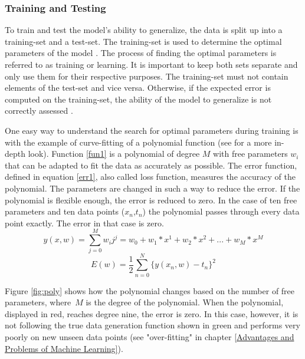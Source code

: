 \subsubsection*{Training and Testing}\label{TT}
To train and test the model's ability to generalize, the data is split up into a training-set and a test-set. The training-set is used to determine the optimal parameters of the model \cite{Bishop}. The process of finding the optimal parameters is referred to as training or learning. It is important to keep both sets separate and only use them for their respective purposes. The training-set must not contain elements of the test-set and vice versa. Otherwise, if the expected error is computed on the training-set, the ability of the model to generalize is not correctly assessed \cite{Xiaogang}.

One easy way to understand the search for optimal parameters during training is with the example of curve-fitting of a polynomial function (see \cite{Bishop} for a more in-depth look). \newline
Function \ref{fun1} is a polynomial of degree \(M\) with free parameters \(w_i\) that can be adapted to fit the data as accurately as possible.
The error function, defined in equation \ref{err1}, also called loss function, measures the accuracy of the polynomial. The parameters are changed in such a way to reduce the error. If the polynomial is flexible enough, the error is reduced to zero. In the case of ten free parameters and ten data points (\(x_n\),\(t_n\)) the polynomial passes through every data point exactly. The error in that case is zero. 
\begin{equation}\label{fun1}
	y(x,w) = \sum_{j=0}^{M}w_ij^j= w_0+w_1*x^1+w_2*x^2+...+w_M*x^M
\end{equation}
\begin{equation}\label{err1}
	E(w) = \frac{1}{2}\sum_{n=0}^{N}\{y(x_n,w)-t_n\}^2
\end{equation}

Figure \ref{fig:poly} shows how the polynomial changes based on the number of free parameters, where~\(M\) is the degree of the polynomial. When the polynomial, displayed in red, reaches degree nine, the error is zero. In this case, however, it is not following the true data generation function shown in green and performs very poorly on new unseen data points (see "over-fitting" in chapter \ref{Advantages and Problems of Machine Learning}).

